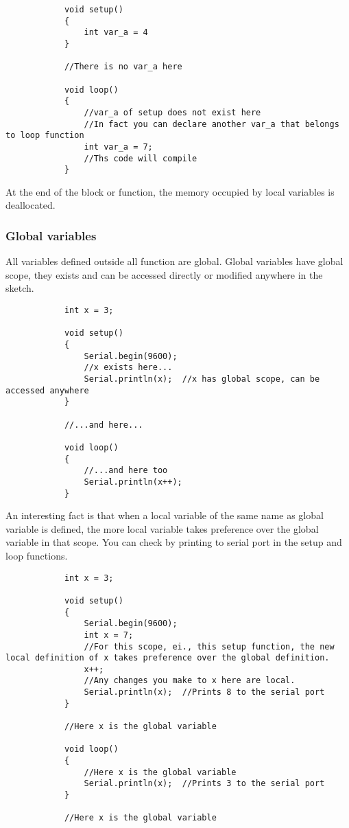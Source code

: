 \documentclass{article}
\begin{document}
			\begin{lstlisting}
			void setup()
			{
				int var_a = 4
			}

			//There is no var_a here

			void loop()
			{
				//var_a of setup does not exist here
				//In fact you can declare another var_a that belongs to loop function
				int var_a = 7;
				//Ths code will compile
			}
			\end{lstlisting}

			At the end of the block or function, the memory occupied by local variables is deallocated.

		\subsubsection{Global variables}

			All variables defined outside all function are global. Global variables have global scope, they exists and can be accessed directly or modified anywhere in the sketch.

			\begin{lstlisting}
			int x = 3;

			void setup()
			{
				Serial.begin(9600);
				//x exists here...
				Serial.println(x);	//x has global scope, can be accessed anywhere
			}

			//...and here...

			void loop()
			{
				//...and here too
				Serial.println(x++);
			}
			\end{lstlisting}

			An interesting fact is that when a local variable of the same name as global variable is defined, the more local variable takes preference over the global variable in that scope. You can check by printing  to serial port in the setup and loop functions.

			\begin{lstlisting}
			int x = 3;

			void setup()
			{
				Serial.begin(9600);
				int x = 7;
				//For this scope, ei., this setup function, the new local definition of x takes preference over the global definition.
				x++;
				//Any changes you make to x here are local.
				Serial.println(x);	//Prints 8 to the serial port
			}

			//Here x is the global variable

			void loop()
			{
				//Here x is the global variable
				Serial.println(x);	//Prints 3 to the serial port
			}

			//Here x is the global variable
			\end{lstlisting}
\end{document}
